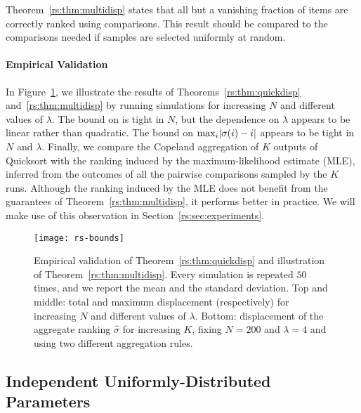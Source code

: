 Theorem~\ref{rs:thm:multidisp} states that all but a vanishing fraction of items are correctly ranked using  comparisons.
This result should be compared to the  comparisons needed if samples are selected uniformly at random.

\paragraph{Empirical Validation}

In Figure~\ref{rs:fig:bounds}, we illustrate the results of Theorems~\ref{rs:thm:quickdisp} and~\ref{rs:thm:multidisp} by running simulations for increasing $N$ and different values of $\lambda$.
The bound on \Disp{\sigma} is tight in $N$, but the dependence on $\lambda$ appears to be linear rather than quadratic.
The bound on $\max_i \lvert\sigma(i) - i\rvert$ appears to be tight in $N$ and $\lambda$.
Finally, we compare the Copeland aggregation of $K$ outputs of Quicksort with the ranking induced by the maximum-likelihood estimate (MLE), inferred from the outcomes of all the pairwise comparisons sampled by the $K$ runs.
Although the ranking induced by the MLE does not benefit from the guarantees of Theorem~\ref{rs:thm:multidisp}, it performs better in practice.
We will make use of this observation in Section~\ref{rs:sec:experiments}.

\begin{figure}[p]
\centering
\texttt{[image: rs-bounds]}
\caption{
Empirical validation of Theorem~\ref{rs:thm:quickdisp} and illustration of Theorem~\ref{rs:thm:multidisp}.
Every simulation is repeated $50$ times, and we report the mean and the standard deviation.
Top and middle: total and maximum displacement (respectively) for increasing $N$ and different values of $\lambda$.
Bottom: displacement of the aggregate ranking $\hat{\sigma}$ for increasing $K$, fixing $N = \num{200}$ and $\lambda = \num{4}$ and using two different aggregation rules.
}
\label{rs:fig:bounds}
\end{figure}


\subsection{Independent Uniformly-Distributed Parameters}
\label{rs:sec:iidunif}

